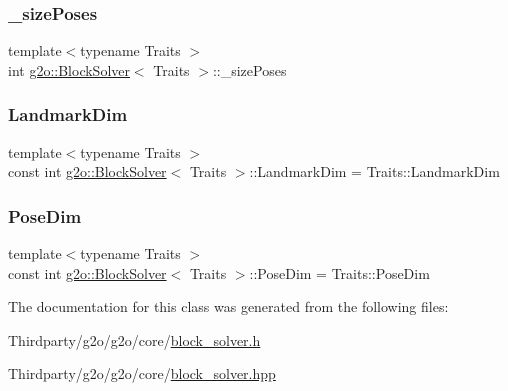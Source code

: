 \subsubsection{\texorpdfstring{\+\_\+size\+Poses}{\_sizePoses}}
{\footnotesize\ttfamily template$<$typename Traits $>$ \\
int \mbox{\hyperlink{classg2o_1_1_block_solver}{g2o\+::\+Block\+Solver}}$<$ Traits $>$\+::\+\_\+size\+Poses\hspace{0.3cm}{\ttfamily [protected]}}

\mbox{\label{classg2o_1_1_block_solver_a2d5e499f65a71985a8256e98c1608dd9}} 
\subsubsection{\texorpdfstring{Landmark\+Dim}{LandmarkDim}}
{\footnotesize\ttfamily template$<$typename Traits $>$ \\
const int \mbox{\hyperlink{classg2o_1_1_block_solver}{g2o\+::\+Block\+Solver}}$<$ Traits $>$\+::Landmark\+Dim = Traits\+::\+Landmark\+Dim\hspace{0.3cm}{\ttfamily [static]}}

\mbox{\label{classg2o_1_1_block_solver_a9a68f557c8e04cd76565fc45e1747e45}} 
\subsubsection{\texorpdfstring{Pose\+Dim}{PoseDim}}
{\footnotesize\ttfamily template$<$typename Traits $>$ \\
const int \mbox{\hyperlink{classg2o_1_1_block_solver}{g2o\+::\+Block\+Solver}}$<$ Traits $>$\+::Pose\+Dim = Traits\+::\+Pose\+Dim\hspace{0.3cm}{\ttfamily [static]}}



The documentation for this class was generated from the following files\+:\begin{DoxyCompactItemize}
\item 
Thirdparty/g2o/g2o/core/\mbox{\hyperlink{block__solver_8h}{block\+\_\+solver.\+h}}\item 
Thirdparty/g2o/g2o/core/\mbox{\hyperlink{block__solver_8hpp}{block\+\_\+solver.\+hpp}}\end{DoxyCompactItemize}

